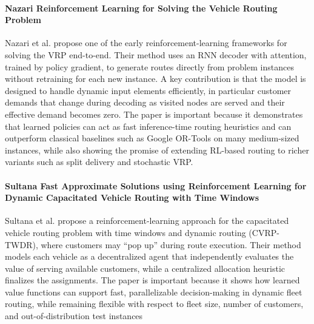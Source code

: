 \paragraph{Nazari Reinforcement Learning for Solving the Vehicle Routing Problem}
Nazari et al. \cite{nazariReinforcementLearningSolving2018} propose one of the early reinforcement-learning frameworks 
for solving the VRP end-to-end. Their method uses an RNN decoder with attention, trained by policy gradient, to generate 
routes directly from problem instances without retraining for each new instance. A key contribution is that the model is 
designed to handle dynamic input elements efficiently, in particular customer demands that change during decoding as 
visited nodes are served and their effective demand becomes zero. The paper is important because it demonstrates that 
learned policies can act as fast inference-time routing heuristics and can outperform classical baselines such as Google 
OR-Tools on many medium-sized instances, while also showing the promise of extending RL-based routing to richer variants 
such as split delivery and stochastic VRP.

\paragraph{Sultana Fast Approximate Solutions using Reinforcement Learning for Dynamic Capacitated Vehicle Routing with Time Windows}
Sultana et al. \cite{sultanaFastApproximateSolutions} propose a reinforcement-learning approach for the capacitated 
vehicle routing problem with time windows and dynamic routing (CVRP-TWDR), where customers may “pop up” during route 
execution. Their method models each vehicle as a decentralized agent that independently evaluates the value of serving 
available customers, while a centralized allocation heuristic finalizes the assignments. The paper is important because 
it shows how learned value functions can support fast, parallelizable decision-making in dynamic fleet routing, while 
remaining flexible with respect to fleet size, number of customers, and out-of-distribution test instances


